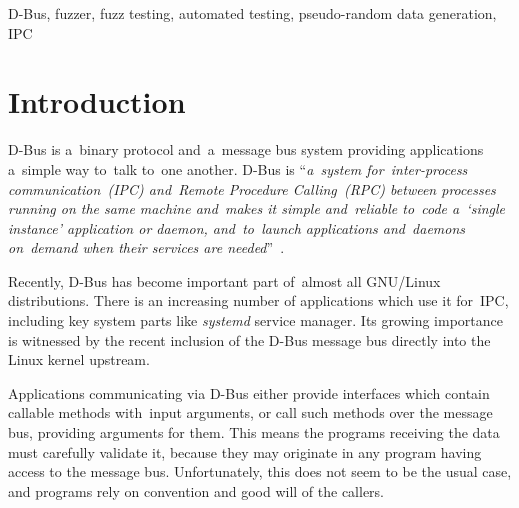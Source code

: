 \documentclass[conference]{IEEEtran}
\begin{document}
\begin{keywords}
D-Bus, fuzzer, fuzz testing, automated testing, pseudo-random data generation,
IPC
\end{keywords}

%
\IEEEpeerreviewmaketitle



\section{Introduction}
D-Bus is a~binary protocol and~a~message bus system providing applications
a~simple way to~talk to~one another. D-Bus is ``\emph{a~system for~\mbox{inter-process}
communication~(IPC) and~Remote Procedure Calling~(RPC) between
processes running on the same machine and~makes it simple and~reliable to~code
a~`single instance' application or daemon, and~to~launch applications and~daemons
on~demand when their services are needed}''~\cite{dbus}.

Recently, D-Bus has become important part of~almost all GNU/Linux
distributions. There is an increasing number of applications which use it
for~IPC, including key system parts like \textit{systemd} service manager. Its growing importance is witnessed by the recent inclusion of the D-Bus message bus directly into the Linux kernel
upstream.

Applications communicating via D-Bus either provide interfaces which contain callable
methods with~input arguments, or call such methods over
the message bus, providing arguments for them. This means the programs
receiving the data must carefully validate it, because they may originate in
any program having access to the message bus. Unfortunately, this does not seem
to be the usual case, and programs rely on convention and good will of the
callers.
\end{document}
